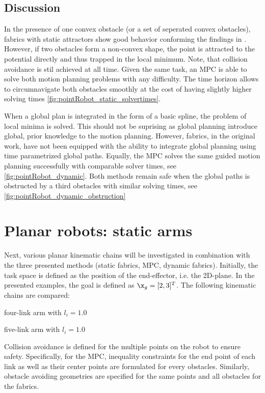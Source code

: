 \subsection{Discussion}

In the presence of one convex obstacle (or a set of seperated convex obstacles), fabrics
with static attractors show good behavior conforming the findings in \cite{Ratliff2020}.
However, if two obstacles form a non-convex shape, the point is attracted to the potential
directly and thus trapped in the local minimum. Note, that collision avoidance is stil
achieved at all time. Given the same task, an MPC is able to solve both motion planning
problems with any difficulty. The time horizon allows to circumnavigate both obstacles
smoothly at the cost of having slightly higher solving times
\cref{fig:pointRobot_static_solvertimes}.

When a global plan is integrated in the form of a basic spline, the problem of local
minima is solved.
This should not be suprising as
global planning introduce global, prior knowledge to the motion planning. However,
fabrics, in the original work, have not been equipped with the ability to integrate global
planning using time parametrized global paths. Equally, the MPC solves the same guided
motion planning successfully with comparable solver times, see
\cref{fig:pointRobot_dynamic}.
Both methods remain safe when the global paths is obstructed by a third obstacles with
similar solving times, see \cref{fig:pointRobot_dynamic_obstruction}

\section{Planar robots: static arms}
Next, various planar kinematic chains will be investigated in combination with the three
presented methods (static fabrics, MPC, dynamic fabrics). Initially, the task space is
defined as the position of the end-effector, i.e. the 2D-plane. In the presented examples,
the goal is defined as $\x_{g} = [2, 3]^T$. The following kinematic chains are compared:
\begin{compactitem}
  \item four-link arm with $l_i = 1.0$
  \item five-link arm with $l_i = 1.0$
\end{compactitem}

Collision avoidance is defined for the multiple points on the robot to ensure safety.
Specifically, for the MPC, inequality constraints for the end point of each link as well as their
center points are formulated for every obstacles. Similarly, obstacle avoiding geometries
are specified for the same points and all obstacles for the fabrics.


